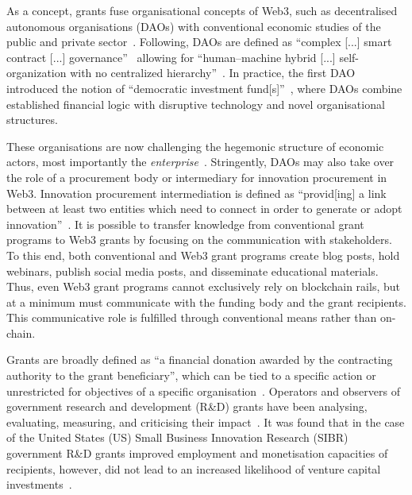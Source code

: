 \documentclass[conference]{IEEEtran}
\begin{document}
As a concept, grants fuse organisational concepts of Web3, such as decentralised autonomous organisations (DAOs) with conventional economic studies of the public and private sector~\cite{ding_desci_2022,monteiro_decentralised_2023,wang_self-sovereign_2020}. Following, DAOs are defined as “complex [...] smart contract [...] governance”~\cite[p.~501]{shermin_disrupting_2017} allowing for “human–machine hybrid [...] self-organization with no centralized hierarchy”~\cite[p.~1564]{ding_desci_2022}. In practice, the first DAO introduced the notion of “democratic investment fund[s]”~\cite[p.~4]{santos_dao_2018}, where DAOs combine established financial logic with disruptive technology and novel organisational structures. 

These organisations are now challenging the hegemonic structure of economic actors, most importantly the \textit{enterprise}~\cite{wang_novel_2024}. Stringently, DAOs may also take over the role of a procurement body or intermediary for innovation procurement in Web3. Innovation procurement intermediation is defined as “provid[ing] a link between at least two entities which need to connect in order to generate or adopt innovation”~\cite[p.~416]{edler_connecting_2016}. It is possible to transfer knowledge from conventional grant programs to Web3 grants by focusing on the communication with stakeholders. To this end, both conventional and Web3 grant programs create blog posts, hold webinars, publish social media posts, and disseminate educational materials. Thus, even Web3 grant programs cannot exclusively rely on blockchain rails, but at a minimum must communicate with the funding body and the grant recipients. This communicative role is fulfilled through conventional means rather than on-chain.

Grants are broadly defined as ``a financial donation awarded by the contracting authority to the grant beneficiary'', which can be tied to a specific action or unrestricted for objectives of a specific organisation~\cite{european_commission_grants_2023}. Operators and observers of government research and development (R\&D) grants have been analysing, evaluating, measuring, and criticising their impact~\cite{howell_financing_2017,lerner_government_2000}. It was found that in the case of the United States (US) Small Business Innovation Research (SIBR) government R\&D grants improved employment and monetisation capacities of recipients, however, did not lead to an increased likelihood of venture capital investments~\cite{lerner_government_2000}.
\end{document}
